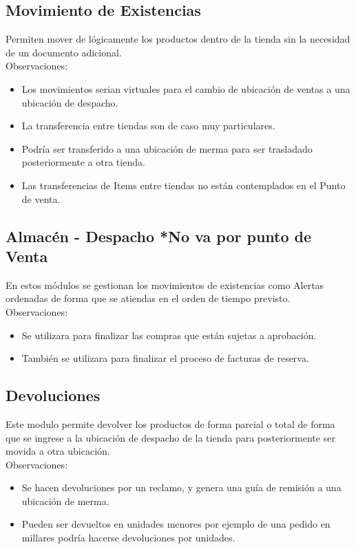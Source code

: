\documentclass[pdftex,12pt,oneside,a4paper,spanish, english, brazil]{abntex2}
\begin{document}
\begin{sloppypar}
              \subsection{Movimiento de Existencias}
              Permiten mover de lógicamente los productos dentro de la tienda sin la necesidad de un documento adicional.\\
              Observaciones:
              \begin{itemize}
                \item Los movimientos serian virtuales para el cambio de ubicación de ventas a una ubicación de despacho.
                \item La transferencia entre tiendas son de caso muy particulares.
                \item Podría ser transferido a una ubicación de merma para ser trasladado posteriormente a otra tienda.
                \item Las transferencias de Items entre tiendas no están contemplados en el Punto de venta.
              \end{itemize}
              \subsection{Almacén - Despacho *No va por punto de Venta}
              En estos módulos se gestionan los movimientos de existencias como Alertas ordenadas de forma que se atiendas en el orden de tiempo previsto.
              Observaciones:
              \begin{itemize}
              	\item Se utilizara para finalizar las compras que están sujetas a aprobación.
              	\item También se utilizara para finalizar el proceso de facturas de reserva.
              \end{itemize}
              \subsection{Devoluciones}
              Este modulo permite devolver los productos de forma parcial o total de forma que se ingrese a la ubicación de despacho de la tienda para posteriormente ser movida a otra ubicación.\\
              Observaciones:
              \begin{itemize}
              	\item Se hacen devoluciones por un reclamo, y genera una guía de remisión a una ubicación de merma.
              	\item Pueden ser devueltos en unidades menores por ejemplo de una pedido en millares podría hacerse devoluciones por unidades.
              \end{itemize}

\end{sloppypar}
\end{document}
